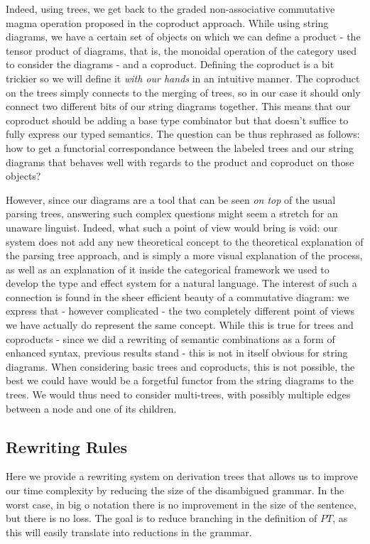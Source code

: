 Indeed, using trees, we get back to the graded non-associative commutative
magma operation proposed in the coproduct approach.
While using string diagrams, we have a certain set of objects on which we can
define a product - the tensor product of diagrams, that is, the monoidal
operation of the category used to consider the diagrams - and a coproduct.
Defining the coproduct is a bit trickier so we will define it \emph{with our
	hands} in an intuitive manner.
The coproduct on the trees simply connects to the merging of trees, so in our
case it should only connect two different bits of our string diagrams together.
This means that our coproduct should be adding a base type combinator but that
doesn't suffice to fully express our typed semantics.
The question can be thus rephrased as follows: how to get a functorial
correspondance between the labeled trees and our string diagrams that behaves
well with regards to the product and coproduct on those objects?

\medskip

However, since our diagrams are a tool that can be seen \emph{on top} of the
usual parsing trees, answering such complex questions might seem a stretch for
an unaware linguist.
Indeed, what such a point of view would bring is void: our system does not
add any new theoretical concept to the theoretical explanation of the parsing
tree approach, and is simply a more visual explanation of the process, as well
as an explanation of it inside the categorical framework we used to develop the
type and effect system for a natural language.
The interest of such a connection is found in the sheer efficient beauty of a
commutative diagram: we express that - however complicated - the two completely
different point of views we have actually do represent the same concept.
While this is true for trees and coproducts - since we did a rewriting of
semantic combinations as a form of enhanced syntax, previous results stand -
this is not in itself obvious for string diagrams.
When considering basic trees and coproducts, this is not possible, the best
we could have would be a forgetful functor from the string diagrams to the
trees.
We would thus need to consider multi-trees, with possibly multiple edges
between a node and one of its children.

\subsection{Rewriting Rules}
\label{subsec:rewrite}
Here we provide a rewriting system on derivation trees that allows us to
improve our time complexity by reducing the size of the disambigued grammar.
In the worst case, in big o notation there is no improvement in the size of the
sentence, but there is no loss.
The goal is to reduce branching in the definition of $PT$, as this will easily
translate into reductions in the grammar.

